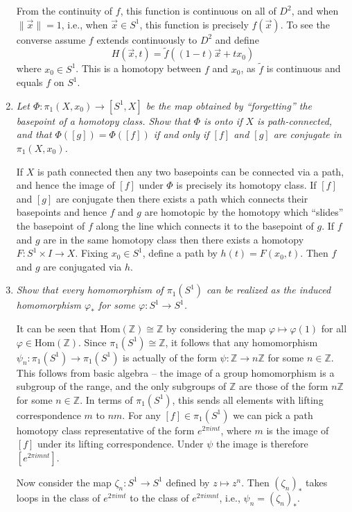 \documentclass[10pt]{article}
\newcommand{\Hom}{\text{Hom}}
\newcommand{\Z}{\mathbb{Z}}
\newcommand{\iso}{\cong}
\begin{document}
\begin{enumerate}
From the continuity of $f$, this function is continuous on all of $D^2$, and when $\|\vec{x}\| = 1$, i.e., when $\vec{x} \in S^1$, this function is precisely $f(\vec{x})$.  To see the converse assume $f$ extends continuously to $D^2$ and define $$H(\vec{x},t) = \tilde{f}((1-t)\vec{x} + tx_0)$$  where $x_0 \in S^1$.  This is a homotopy between $f$ and $x_0$, as $\tilde{f}$ is continuous and equals $f$ on $S^1$.

\item \emph{Let $\Phi: \pi_1(X,x_0) \rightarrow [S^1, X]$ be the map obtained by ``forgetting'' the basepoint of a homotopy class.  Show that $\Phi$ is onto if $X$ is path-connected, and that $\Phi([g]) = \Phi([f])$ if and only if $[f]$ and $[g]$ are conjugate in $\pi_1(X,x_0)$.}

If $X$ is path connected then any two basepoints can be connected via a path, and hence the image of $[f]$ under $\Phi$ is precisely its homotopy class.  If $[f]$ and $[g]$ are conjugate then there exists a path which connects their basepoints and hence $f$ and $g$ are homotopic by the homotopy which ``slides'' the basepoint of $f$ along the line which connects it to the basepoint of $g$.  If $f$ and $g$ are in the same homotopy class then there exists a homotopy $F: S^1 \times I \rightarrow X$.  Fixing $x_0 \in S^1$, define a path by $h(t) = F(x_0, t)$.  Then $f$ and $g$ are conjugated via $h$.

\item \emph{Show that every homomorphism of $\pi_1(S^1)$ can be realized as the induced homomorphism $\varphi_\ast$ for some $\varphi: S^1 \rightarrow S^1$.}

It can be seen that $\Hom(\Z) \iso \Z$ by considering the map $\varphi \mapsto \varphi(1)$ for all $\varphi \in \Hom(\Z)$.  Since $\pi_1(S^1) \iso \Z$, it follows that any homomorphism $\psi_n: \pi_1(S^1) \rightarrow \pi_1(S^1)$ is actually of the form $\psi: \Z \rightarrow n\Z$ for some $n \in \Z$.  This follows from basic algebra -- the image of a group homomorphism is a subgroup of the range, and the only subgroups of $\Z$ are those of the form $n\Z$ for some $n \in \Z$.  In terms of $\pi_1(S^1)$, this sends all elements with lifting correspondence $m$ to $nm$.  For any $[f] \in \pi_1(S^1)$ we can pick a path homotopy class representative of the form $e^{2 \pi i m t}$, where $m$ is the image of $[f]$ under its lifting correspondence.  Under $\psi$ the image is therefore $[e^{2 \pi i mn t}]$.

Now consider the map $\zeta_n : S^1 \rightarrow S^1$ defined by $z \mapsto z^n$.  Then $(\zeta_n)_\ast$ takes loops in the class of $e^{2 \pi i m t}$ to the class of $e^{2 \pi i mn t}$, i.e., $\psi_n = (\zeta_n)_\ast$.
\end{enumerate}
\end{document}
